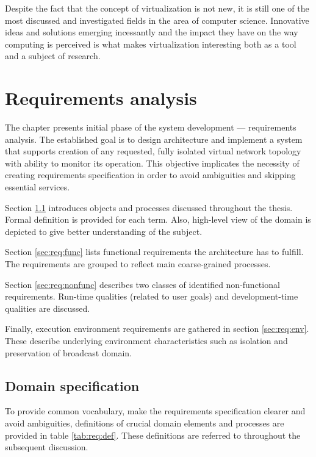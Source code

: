 \documentclass[11pt,openany]{book}
\begin{document}
      Despite the fact that the concept of virtualization is not new, it is still one of the most discussed and
      investigated fields in the area of computer science. Innovative ideas and solutions emerging incessantly and the
      impact they have on the way computing is perceived is what makes virtualization interesting both as a tool and
      a subject of research.


  \chapter{Requirements analysis}
  \label{chap:req}

    The chapter presents initial phase of the system development --- requirements analysis. The established goal is to
    design architecture and implement a system that supports creation of any requested, fully isolated virtual network
    topology with ability to monitor its operation. This objective implicates the necessity of creating requirements
    specification in order to avoid ambiguities and skipping essential services.

    Section \ref{sec:req:spec} introduces objects and processes discussed throughout the thesis. Formal definition is
    provided for each term. Also, high-level view of the domain is depicted to give better understanding of the subject.

    Section \ref{sec:req:func} lists functional requirements the architecture has to fulfill. The requirements are
    grouped to reflect main coarse-grained processes.
    
    Section \ref{sec:req:nonfunc} describes two classes of identified non-functional requirements. Run-time qualities
    (related to user goals) and development-time qualities are discussed.

    Finally, execution environment requirements are gathered in section \ref{sec:req:env}. These describe underlying
    environment characteristics such as isolation and preservation of broadcast domain.


    \section{Domain specification}
    \label{sec:req:spec}

      To provide common vocabulary, make the requirements specification clearer and avoid ambiguities, definitions of
      crucial domain elements and processes are provided in table \ref{tab:req:def}. These definitions are referred to
      throughout the subsequent discussion.
\end{document}
